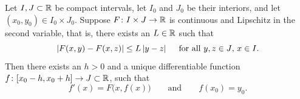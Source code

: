 \begin{thm}%
Let $I, J \subset {\mathbb{R}}$ be compact intervals, let $I_0$ and $J_0$
be their interiors, and 
let $(x_0,y_0) \in I_0 \times J_0$.
Suppose $F \colon I \times J \to {\mathbb{R}}$ is continuous
and Lipschitz in the second variable, that is, there exists
an $L \in {\mathbb{R}}$ such that
\begin{equation*}
\left\lvert {F(x,y) - F(x,z)} \right\rvert \leq L \left\lvert {y-z} \right\rvert
\ \ \ \text{ for all $y,z \in J$, $x \in I$} .
\end{equation*}
Then there exists an $h > 0$ and a unique differentiable
function
$f \colon [x_0 - h, x_0 + h] \to J \subset {\mathbb{R}}$, such that
\begin{equation*}
f'(x) = F\bigl(x,f(x)\bigr) \qquad \text{and} \qquad f(x_0) = y_0.
\end{equation*}
\end{thm}


